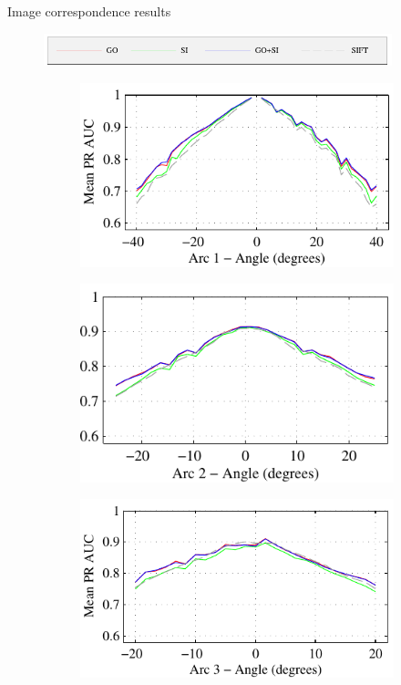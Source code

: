 \documentclass[14pt,t]{beamer}
\begin{document}
%
\begin{frame}{Image correspondence results}
\begin{figure}
	\hspace{0.6cm}\includegraphics[width=0.9\textwidth]{img/dtuResults_opponent_legend_cropped.pdf} \\
	\begin{subfigure}[t]{0.49\textwidth}
		\includegraphics[width=\textwidth]{img/dtuResultsPR_opponent_1.pdf}
	\end{subfigure}
	\begin{subfigure}[t]{0.447\textwidth}
		\includegraphics[width=\textwidth]{img/dtuResultsPR_opponent_2.pdf}
	\end{subfigure}
	\begin{subfigure}[t]{0.49\textwidth}
		\includegraphics[width=\textwidth]{img/dtuResultsPR_opponent_3.pdf}

\end{subfigure}
\end{figure}
\end{frame}
\end{document}
